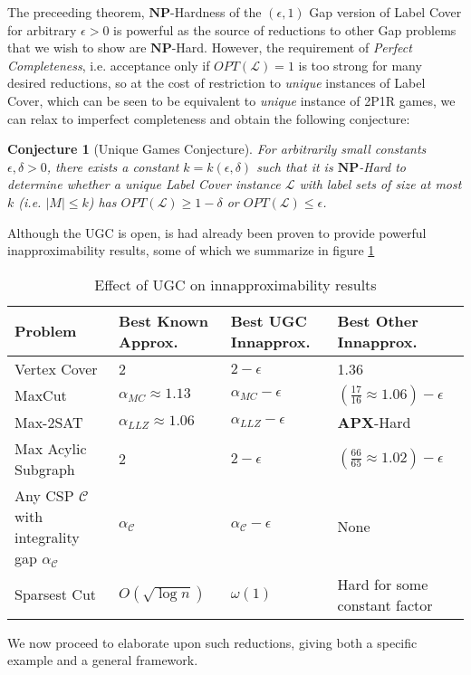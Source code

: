 \documentclass{article}
\newtheorem{conjecture}{Conjecture}
\newcommand{\NP}{\ensuremath{\mathbf{NP}}}
\newcommand{\APX}{\ensuremath{\mathbf{APX}}}
\newcommand{\C}{\ensuremath{\mathcal{C}}}
\renewcommand{\a}{\alpha}
\renewcommand{\d}{\delta}
\newcommand{\e}{\epsilon}
\renewcommand{\L}{\ensuremath{\mathcal{L}}}
\newcommand{\OPT}{\ensuremath{\mathit{OPT}}}
\newcommand{\1}{\mathbbm{1}}
\begin{document}
The preceeding theorem, $\NP$-Hardness of the $(\e, 1)$ Gap version of Label Cover for arbitrary $\e > 0$ is powerful as the source of reductions to other Gap problems that we wish to show are $\NP$-Hard. However, the requirement of \textit{Perfect Completeness}, i.e. acceptance only if $\OPT(\L) = 1$ is too strong for many desired reductions, so at the cost of restriction to \textit{unique} instances of Label Cover, which can be seen to be equivalent to \textit{unique} instance of 2P1R games, we can relax to imperfect completeness and obtain the following conjecture:
\begin{conjecture}[Unique Games Conjecture]
  For arbitrarily small constants $\e, \d > 0$, there exists a constant $k = k(\e, \d)$ such that it is \NP-Hard to determine whether a unique Label Cover instance $\L$ with label sets of size at most $k$ (i.e. $|M| \le k$) has $\OPT(\L) \ge 1 - \d$ or $\OPT(\L) \le \e$.
\end{conjecture}

Although the UGC is open, is had already been proven to provide powerful inapproximability results, some of which we summarize in figure \ref{ugctable}

\begin{table}[]
  \centering
  \begin{tabular}{|p{2.5cm}|p{2.5cm}|p{2cm}|p{2.5cm}|}
    \hline 
    \textbf{Problem} & \textbf{Best Known Approx.} & \textbf{Best UGC Innapprox.} & \textbf{Best Other Innapprox.} \\\hline
    Vertex Cover & 2 & $2 - \e$ & 1.36 \\\hline
    MaxCut & $\a_{MC} \approx 1.13$ & $\a_{MC} - \e$ & $(\frac{17}{16} \approx 1.06) - \e$ \\\hline
    Max-2SAT &$\a_{LLZ} \approx 1.06$ & $\a_{LLZ} - \e$ & \APX-Hard \\\hline
    Max Acylic Subgraph & 2 & $ 2 - \e$ & $(\frac{66}{65} \approx 1.02)- \e$ \\\hline
    Any CSP $\mathcal{C}$ with integrality gap $\a_\C$ & $\a_\C$ & $\a_\C - \e$ & None \\\hline
    Sparsest Cut & $O(\sqrt{\log{n}})$ & $\omega(1)$ & Hard for some constant factor\\\hline
  \end{tabular}
  \caption{Effect of UGC on innapproximability results}
  \label{ugctable}
\end{table}

We now proceed to elaborate upon such reductions, giving both a specific example and a general framework.
\end{document}
